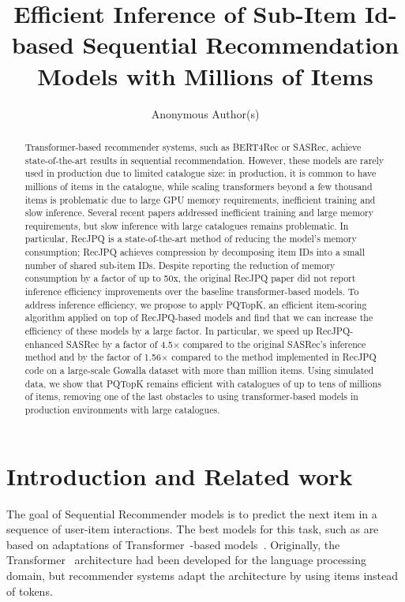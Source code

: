 \documentclass[sigconf,natbib=true, review=true]{acmart} %
\title{Efficient Inference of Sub-Item Id-based Sequential Recommendation Models with Millions of Items}
\author{Anonymous Author(s)}
\affiliation{%
  \institution{Organisation} \country{A Country}}
\begin{document}
\begin{abstract}
Transformer-based recommender systems, such as BERT4Rec or SASRec, achieve state-of-the-art results in sequential recommendation. However, these models are rarely used in production due to limited catalogue size: in production, it is common to have millions of items in the catalogue, while scaling transformers beyond a few thousand items is problematic due to large GPU memory requirements, inefficient training and slow inference. Several recent papers addressed inefficient training and large memory requirements, but slow inference with large catalogues remains problematic. In particular, RecJPQ is a state-of-the-art method of reducing the model's memory consumption; RecJPQ achieves compression by decomposing item IDs into a small number of shared sub-item IDs. Despite reporting the reduction of memory consumption by a factor of up to 50x, the original RecJPQ paper did not report inference efficiency improvements over the baseline transformer-based models. To address inference efficiency, we propose to apply PQTopK, an efficient item-scoring algorithm applied on top of RecJPQ-based models and find that we can increase the efficiency of these models by a large factor. In particular, we speed up RecJPQ-enhanced SASRec by a factor of 4.5$\times$ compared to the original SASRec's inference method and by the factor of  1.56$\times$ compared to the method implemented in RecJPQ code on a large-scale Gowalla dataset with more than million items. Using simulated data, we show that PQTopK remains efficient with catalogues of up to tens of millions of items, removing one of the last obstacles to using transformer-based models in production environments with large catalogues.
\end{abstract}

\maketitle

\section{Introduction and Related work}
The goal of Sequential Recommender models is to predict the next item in a sequence of user-item interactions. The best models for this task, such as are based on adaptations of Transformer~\cite{Transformer}-based models~\cite{SASRec, BERT4Rec, Bert4RecRepro, petrovGSASRecReducingOverconfidence2023}. 
Originally, the Transformer~\cite{Transformer} architecture had been developed for the language processing domain, but recommender systems adapt the architecture by using items instead of tokens. 
\end{document}
